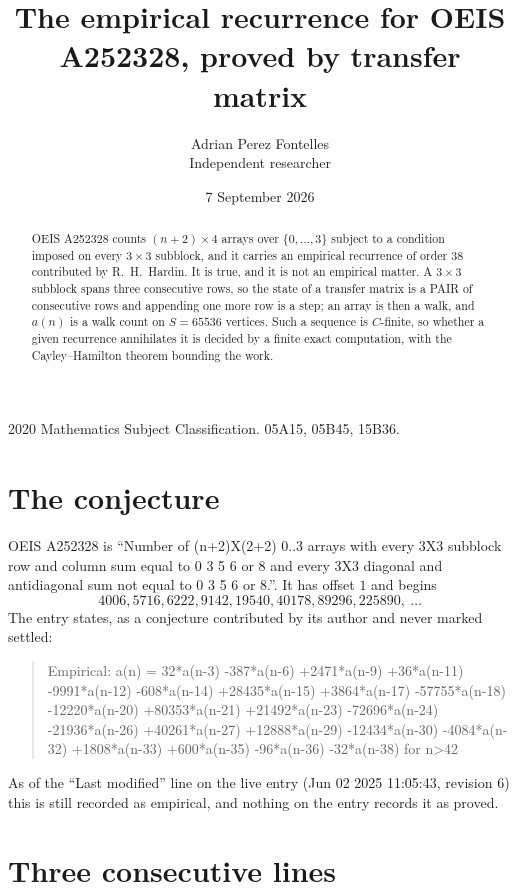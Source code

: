 \documentclass[11pt,a4paper]{article}
\title{The empirical recurrence for OEIS A252328, proved by transfer matrix}
\author{Adrian Perez Fontelles\\ \small Independent researcher}
\date{7 September 2026}
\theoremstyle{plain}
\theoremstyle{definition}
\begin{document}
\maketitle

\begin{abstract}
OEIS A252328 counts $(n+2)\times4$ arrays over $\{0,\dots,3\}$ subject to a condition imposed on
every $3\times3$ subblock, and it carries an empirical recurrence of order $38$
contributed by R.~H.~Hardin. It is true, and it is not an empirical matter. A $3\times3$
subblock spans three consecutive rows, so the state of a transfer matrix is a PAIR of
consecutive rows and appending one more row is a step; an array is then a walk, and
$a(n)$ is a walk count on $S=65536$ vertices. Such a sequence is $C$-finite, so whether a given
recurrence annihilates it is decided by a finite exact computation, with the Cayley--Hamilton
theorem bounding the work.
\end{abstract}

\noindent\small 2020 Mathematics Subject Classification. 05A15, 05B45, 15B36.\normalsize

\section{The conjecture}

OEIS A252328 is ``Number of (n+2)X(2+2) 0..3 arrays with every 3X3 subblock row and column sum equal to 0 3 5 6 or 8 and every 3X3 diagonal and antidiagonal sum not equal to 0 3 5 6 or 8.''. It has offset $1$ and begins
\[
4006, 5716, 6222, 9142, 19540, 40178, 89296, 225890,\ \dots
\]
The entry states, as a conjecture contributed by its author and never marked settled:
\begin{quote}
Empirical: a(n) = 32*a(n-3) -387*a(n-6) +2471*a(n-9) +36*a(n-11) -9991*a(n-12) -608*a(n-14) +28435*a(n-15) +3864*a(n-17) -57755*a(n-18) -12220*a(n-20) +80353*a(n-21) +21492*a(n-23) -72696*a(n-24) -21936*a(n-26) +40261*a(n-27) +12888*a(n-29) -12434*a(n-30) -4084*a(n-32) +1808*a(n-33) +600*a(n-35) -96*a(n-36) -32*a(n-38) for n>42
\end{quote}
As of the ``Last modified'' line on the live entry (Jun 02 2025 11:05:43, revision 6) this is still
recorded as empirical, and nothing on the entry records it as proved.

\section{Three consecutive lines}
\end{document}
